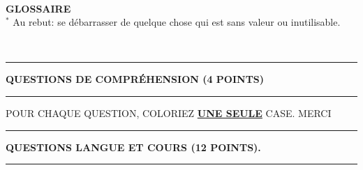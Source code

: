 \documentclass[a3paper,landscape,10pt]{article}
\begin{document}
{\begin{multicols}{2}
\begin{flushleft}
\begin{center}
\begin{flushleft}
 ~ ~ ~\\

\textbf{GLOSSAIRE}\\
$^{*}$ Au rebut: se débarrasser de quelque chose qui est sans valeur ou inutilisable.\\


\end{flushleft}
 \end{center}
\end{flushleft}
~ ~ ~\\


\begin{flushleft}\hrule\vspace{2mm}\begin{center}\large\bf QUESTIONS DE COMPRÉHENSION (4 POINTS) \end{center}
\vspace{1mm}\hrule \end{flushleft}

POUR CHAQUE QUESTION, COLORIEZ \textbf{\underline{UNE SEULE}} CASE. MERCI\\






\begin{flushleft}\hrule\vspace{2mm}\begin{center}\large\bf QUESTIONS LANGUE ET COURS  (12 POINTS). \end{center}
\vspace{1mm}\hrule \end{flushleft}



\end{multicols}}
\end{document}

